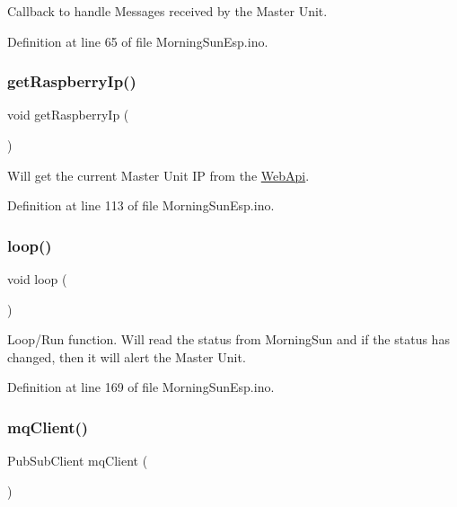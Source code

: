 Callback to handle Messages received by the Master Unit. 

Definition at line 65 of file Morning\+Sun\+Esp.\+ino.

\mbox{\label{_morning_sun_esp_8ino_a7a69432900bad935bd00eb0a9d4bf61f}} 
\subsubsection{\texorpdfstring{get\+Raspberry\+Ip()}{getRaspberryIp()}}
{\footnotesize\ttfamily void get\+Raspberry\+Ip (\begin{DoxyParamCaption}{ }\end{DoxyParamCaption})}

Will get the current Master Unit IP from the \mbox{\hyperlink{namespace_web_api}{Web\+Api}}. 

Definition at line 113 of file Morning\+Sun\+Esp.\+ino.

\mbox{\label{_morning_sun_esp_8ino_afe461d27b9c48d5921c00d521181f12f}} 
\subsubsection{\texorpdfstring{loop()}{loop()}}
{\footnotesize\ttfamily void loop (\begin{DoxyParamCaption}{ }\end{DoxyParamCaption})}

Loop/\+Run function. Will read the status from Morning\+Sun and if the status has changed, then it will alert the Master Unit. 

Definition at line 169 of file Morning\+Sun\+Esp.\+ino.

\mbox{\label{_morning_sun_esp_8ino_a3723ecd4627fe1acd7f94dd266f1105a}} 
\subsubsection{\texorpdfstring{mq\+Client()}{mqClient()}}
{\footnotesize\ttfamily Pub\+Sub\+Client mq\+Client (\begin{DoxyParamCaption}\item[{\mbox{\hyperlink{_snap_box_8ino_abd77e757e4b3bb6f1e4b42b21ea9e040}{esp\+Client}}}]{ }\end{DoxyParamCaption})}

